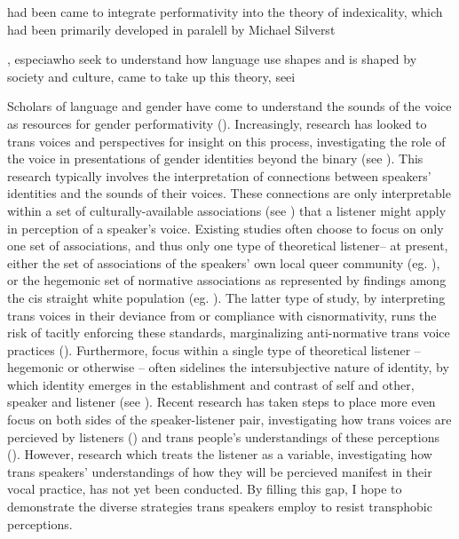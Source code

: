 	
	 had been came to integrate performativity into the theory of indexicality, which had been primarily developed in paralell by  Michael Silverst


, especiawho seek to understand how language use shapes and is shaped by society and culture, came to take up this theory, seei



Scholars of language and gender have come to understand the sounds of the voice as resources for gender performativity (\cite{bucholtz_feminist_2014}). Increasingly, research has looked to trans voices and perspectives for insight on this process, investigating the role of the voice in presentations of gender identities beyond the binary (see \cite{zimman_transgender_2020}). This research typically involves the interpretation of connections between speakers' identities and the sounds of their voices. These connections are only interpretable within a set of culturally-available associations (see \cite{calder_whose_2021}) that a listener might apply in perception of a speaker's voice. Existing studies often choose to focus on only one set of associations, and thus only one type of theoretical listener-- at present, either the set of associations of the speakers' own local queer community (eg. \cite{calder_sissy_2019}), or the hegemonic set of normative associations as represented by findings among the cis straight white population (eg. \cite{hazenberg_language_2012, podesva_sexuality_2015}). The latter type of study, by interpreting trans voices in their deviance from or compliance with cisnormativity, runs the risk of tacitly enforcing these standards, marginalizing anti-normative trans voice practices (\cite{calder_interrogating_2025}). Furthermore, focus within a single type of theoretical listener -- hegemonic or otherwise -- often sidelines the intersubjective nature of identity, by which identity emerges in the establishment and contrast of self and other, speaker and listener (see \cite{bucholtz_locating_2010}). Recent research has taken steps to place more even focus on both sides of the speaker-listener pair, investigating how trans voices are percieved by listeners (\cite{jessee_cisgender_2025}) and trans people's understandings of these perceptions (\cite{heffernan_constructing_2023}). However, research which treats the listener as a variable, investigating how trans speakers' understandings of how they will be percieved manifest in their vocal practice, has not yet been conducted. By filling this gap, I hope to demonstrate the diverse strategies trans speakers employ to resist transphobic perceptions.



